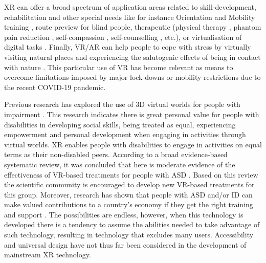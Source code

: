 \documentclass[11pt,english]{nik}
\begin{document}
XR can offer a broad spectrum of application
areas \autocite{mott2019accessible} related to
skill-development, rehabilitation and other special needs like for instance Orientation and Mobility
training \autocite{zhao2018enabling}, route preview for blind people, therapeutic (physical
therapy \autocite{gonzalezfranco2014empowering}, phantom pain reduction \autocite{you2005virtual}, 
self-compassion \autocite{falconer2014embodying},
self-counselling \autocite{osimo2015conversations}, etc.), 
or virtualisation of digital tasks \autocite{mott2019accessible}. 
Finally, VR/AR can help
people to cope with stress by virtually visiting natural places and experiencing the salutogenic effects of being in
contact with nature \autocite{white2018a,litleskare2020enable}.
This particular use of VR has become relevant as means to overcome limitations imposed by major lock-downs or
mobility restrictions due to the recent COVID-19 pandemic. 

Previous research has explored the use of 3D virtual worlds for people with impairment
\autocite{standen-brown-VR-Review-2005,Standen-Brown-VRRole-2006,Carr2010xd}. 
This research indicates there is great personal value for people with disabilities in
developing social skills, being treated as equal, experiencing empowerment and personal development when engaging in
activities through virtual worlds. XR enables people with disabilities to engage in activities on equal terms as their
non-disabled peers. According to a broad evidence-based systematic review, it was concluded that here is moderate
evidence of the effectiveness of VR-based treatments for people with ASD \autocite{mesa-gresa-effectiveness-2018}. 
Based on this review the scientific
community is encouraged to develop new VR-based treatments for this group. Moreover, research has shown that people
with ASD and/or ID can make valued contributions to a country’s economy if they get the right training and
support \autocite{parmenter-2011}. The possibilities are
endless, however, when this technology is developed there is a tendency to assume the abilities needed to take
advantage of such technology, resulting in technology that excludes many users. Accessibility and universal design
have not thus far been considered in the development of mainstream XR technology. 
\end{document}
